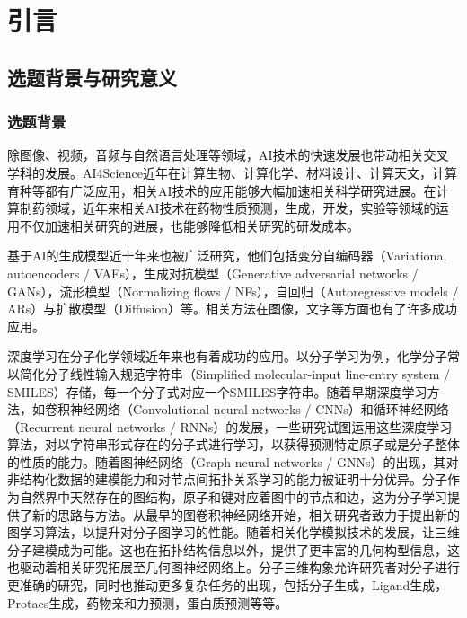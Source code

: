 \mainmatter
\fancyfoot[EC,OC]{\hspace*{1 em}\thepage{}\hspace*{1 em}}
\normalsize
{}
\chapter[引言]{引言}\fancyhead[C]{\xiaowuhao} %
\section{选题背景与研究意义}
\subsection{选题背景}
除图像、视频，音频与自然语言处理等领域，AI技术的快速发展也带动相关交叉学科的发展。AI4Science近年在计算生物、计算化学、材料设计、计算天文，计算育种等都有广泛应用，相关AI技术的应用能够大幅加速相关科学研究进展。在计算制药领域，近年来相关AI技术在药物性质预测，生成，开发，实验等领域的运用不仅加速相关研究的进展，也能够降低相关研究的研发成本。

基于AI的生成模型近十年来也被广泛研究，他们包括变分自编码器（Variational autoencoders / VAEs）\cite{vae_kingma_13}，生成对抗模型（Generative adversarial networks / GANs）\cite{gan_goodfellow_14}，流形模型（Normalizing flows / NFs）\cite{nice_dinh_15,density_dinh_17}，自回归（Autoregressive models / ARs）\cite{ar_oord_16}与扩散模型（Diffusion）\cite{deepunsupervised_dickstein_15,generative_song_19}等。相关方法在图像，文字等方面也有了许多成功应用。

深度学习在分子化学领域近年来也有着成功的应用。以分子学习为例，化学分子常以简化分子线性输入规范字符串（Simplified molecular-input line-entry system / SMILES）\cite{smiles_weinberger_88}存储，每一个分子式对应一个SMILES字符串。随着早期深度学习方法，如卷积神经网络（Convolutional neural networks / CNNs）\cite{cnnsmiles_hirohara_18}和循环神经网络（Recurrent neural networks / RNNs）\cite{rnnsmiles_bjerrum_17,practicalmodel_liu_19,deeppurpose_huang_20}的发展，一些研究试图运用这些深度学习算法，对以字符串形式存在的分子式进行学习，以获得预测特定原子或是分子整体的性质的能力。随着图神经网络（Graph neural networks / GNNs）\cite{semisupervised_kipf_17,inductive_hamilton_17,howpowerful_xu_18}的出现，其对非结构化数据的建模能力和对节点间拓扑关系学习的能力被证明十分优异。分子作为自然界中天然存在的图结构，原子和键对应着图中的节点和边，这为分子学习提供了新的思路与方法。从最早的图卷积神经网络开始，相关研究者致力于提出新的图学习算法，以提升对分子图学习的性能。随着相关化学模拟技术的发展，让三维分子建模成为可能。这也在拓扑结构信息以外，提供了更丰富的几何构型信息，这也驱动着相关研究拓展至几何图神经网络上。分子三维构象允许研究者对分子进行更准确的研究，同时也推动更多复杂任务的出现，包括分子生成，Ligand生成，Protacs生成，药物亲和力预测，蛋白质预测等等。

